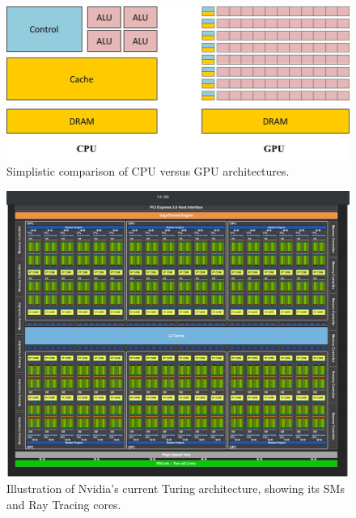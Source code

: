 \begin{figure}
	\centering
	\includegraphics[width = 0.8\linewidth]{Figures/cpuvsgpu}
	\caption{Simplistic comparison of CPU versus GPU architectures.}
	\label{fig:cpugpu}
\end{figure}
\begin{figure}
	\centering
	\includegraphics[width =0.65\linewidth]{Figures/turing}
	\caption{Illustration of Nvidia's current Turing architecture, showing its SMs and Ray Tracing cores.~\cite{turing}}
	\label{fig:turing}
\end{figure}

